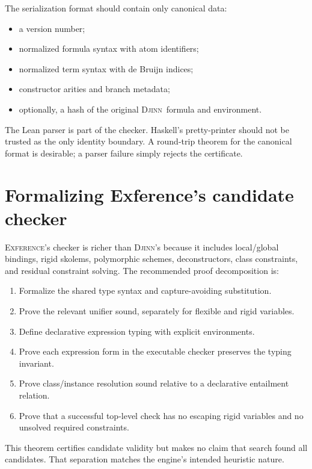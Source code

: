 \documentclass[11pt,letterpaper,openany]{report}
\theoremstyle{definition}
\theoremstyle{remark}
\newcommand{\Djinn}{\textsc{Djinn}}
\newcommand{\Exference}{\textsc{Exference}}
\begin{document}
The serialization format should contain only canonical data:

\begin{itemize}
\item a version number;
\item normalized formula syntax with atom identifiers;
\item normalized term syntax with de Bruijn indices;
\item constructor arities and branch metadata;
\item optionally, a hash of the original \Djinn\ formula and environment.
\end{itemize}

The Lean parser is part of the checker. Haskell's pretty-printer should not be trusted as the only identity boundary. A round-trip theorem for the canonical format is desirable; a parser failure simply rejects the certificate.

\section{Formalizing Exference's candidate checker}
\label{sec:exference-checker}

\Exference's checker is richer than \Djinn's because it includes local/global bindings, rigid skolems, polymorphic schemes, deconstructors, class constraints, and residual constraint solving. The recommended proof decomposition is:

\begin{enumerate}
\item Formalize the shared type syntax and capture-avoiding substitution.
\item Prove the relevant unifier sound, separately for flexible and rigid variables.
\item Define declarative expression typing with explicit environments.
\item Prove each expression form in the executable checker preserves the typing invariant.
\item Prove class/instance resolution sound relative to a declarative entailment relation.
\item Prove that a successful top-level check has no escaping rigid variables and no unsolved required constraints.
\end{enumerate}

This theorem certifies candidate validity but makes no claim that search found all candidates. That separation matches the engine's intended heuristic nature.
\end{document}
